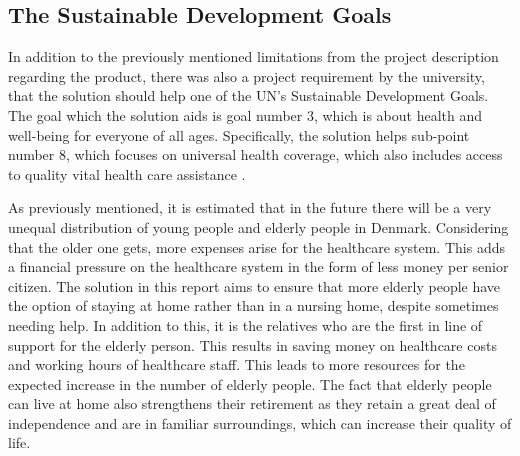 \subsection{The Sustainable Development Goals}
In addition to the previously mentioned limitations from the project description regarding the product, there was also a project requirement by the university, that the solution should help one of the UN's Sustainable Development Goals. The goal which the solution aids is goal number 3, which is about health and well-being for everyone of all ages. Specifically, the solution helps sub-point number 8, which focuses on universal health coverage, which also includes access to quality vital health care assistance \cite{martin_health_nodate}. 

As previously mentioned, it is estimated that in the future there will be a very unequal distribution of young people and elderly people in Denmark. Considering that the older one gets, more expenses arise for the healthcare system. This adds a financial pressure on the healthcare system in the form of less money per senior citizen. The solution in this report aims to ensure that more elderly people have the option of staying at home rather than in a nursing home, despite sometimes needing help. In addition to this, it is the relatives who are the first in line of support for the elderly person. This results in saving money on healthcare costs and working hours of healthcare staff. This leads to more resources for the expected increase in the number of elderly people. The fact that elderly people can live at home also strengthens their retirement as they retain a great deal of independence and are in familiar surroundings, which can increase their quality of life. 

 